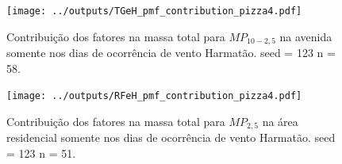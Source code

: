 \begin{landscape}
  \begin{figure}
    \centering
    \begin{minipage}[b]{0.45\linewidth}
      \texttt{[image: ../outputs/TGeH\_pmf\_contribution\_pizza4.pdf]}
      \caption{Contribuição dos fatores na massa total para $MP_{10-2,5}$ na avenida
               somente nos dias de ocorrência de vento Harmatão. seed = 123 n = 58.
               \label{fig:TIeH_contribution4}}
    \end{minipage}%
    \hspace{0.5cm}
    \begin{minipage}[b]{0.45\linewidth}
      
    \end{minipage}
  \end{figure}
\end{landscape}

\begin{landscape}
  \begin{figure}
    \centering
    \begin{minipage}[b]{0.45\linewidth}
      \texttt{[image: ../outputs/RFeH\_pmf\_contribution\_pizza4.pdf]}
      \caption{Contribuição dos fatores na massa total para $MP_{2,5}$ na área
               residencial somente nos dias de ocorrência de vento Harmatão. seed = 123 n = 51.
               \label{fig:RFeH_contribution4}}
    \end{minipage}%
    \hspace{0.5cm}
    \begin{minipage}[b]{0.45\linewidth}
      
    \end{minipage}
  \end{figure}
\end{landscape}

